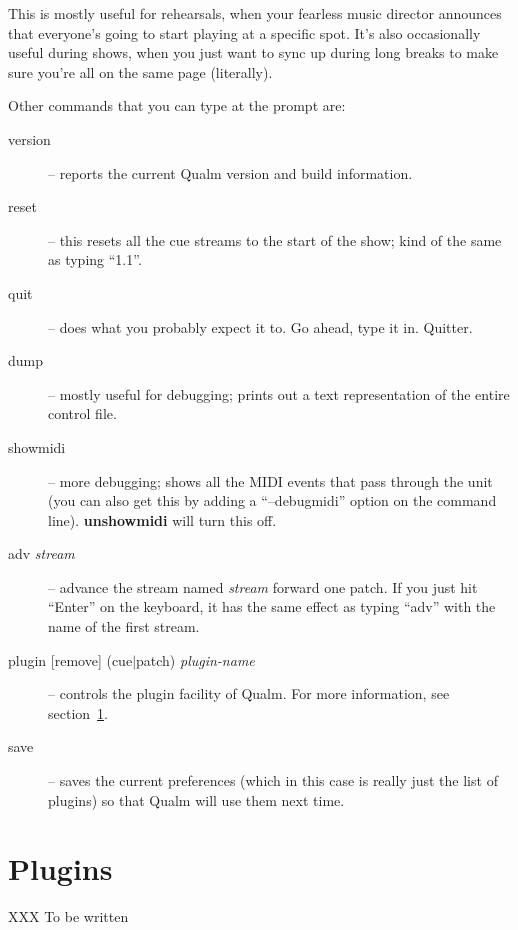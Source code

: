 \documentclass{article}
\newcommand{\q}{{\textsf{Qualm}}\xspace}
\begin{document}
This is mostly useful for rehearsals, when your fearless music
director announces that everyone's going to start playing at a specific
spot.  It's also occasionally useful during shows, when you just want
to sync up during long breaks to make sure you're all on the same page
(literally).

Other commands that you can type at the prompt are:

\begin{description}
\item[version] -- reports the current \q version and build
      information.

\item[reset] -- this resets all the cue streams to the start of the
      show; kind of the same as typing ``1.1''.

\item[quit] -- does what you probably expect it to.  Go ahead, type it
      in.  Quitter.

\item[dump] -- mostly useful for debugging; prints out a text
      representation of the entire control file.

\item[showmidi] -- more debugging; shows all the MIDI events that pass
      through the unit (you can also get this by adding a ``--debugmidi''
      option on the command line).  {\bf unshowmidi} will turn this
      off.

\item[adv \textit{stream}] -- advance the stream named {\em stream}
      forward one patch.  If you just hit ``Enter'' on the keyboard,
      it has the same effect as typing ``adv'' with the name of the
      first stream.

\item[plugin {[remove]} (cue$\mid$patch) \textit{plugin-name}] -- controls
      the plugin facility of \q.  For more information, see
      section~\ref{sec:plugins}.

\item[save] -- saves the current preferences (which in this case is
      really just the list of plugins) so that \q will use them next
      time.
\end{description}

\section{Plugins}
\label{sec:plugins}
XXX To be written
\end{document}
